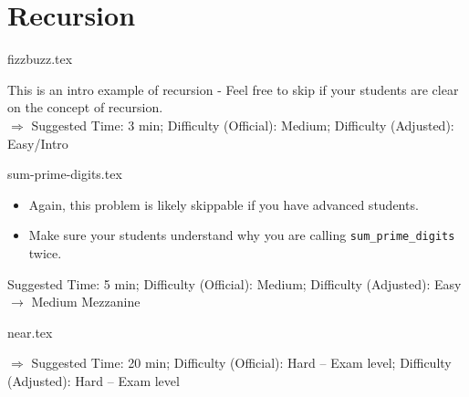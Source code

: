 \documentclass{exam}
\begin{document}
\section{Recursion}
\begin{questions}
    {fizzbuzz.tex}
    \begin{questionmeta}
        This is an intro example of recursion - Feel free to skip if your students are clear on the concept of recursion.\\
        $\Rightarrow$ Suggested Time: 3 min; Difficulty (Official): Medium; Difficulty (Adjusted): Easy/Intro
      \end{questionmeta}

    {sum-prime-digits.tex}
    \begin{questionmeta}
        \begin{itemize}
            \item Again, this problem is likely skippable if you have advanced students.
            \item Make sure your students understand why you are calling \lstinline{sum_prime_digits} twice.
        \end{itemize}    
        Suggested Time: 5 min; Difficulty (Official): Medium; Difficulty (Adjusted): Easy $\rightarrow$ Medium Mezzanine
      \end{questionmeta}
    
    {near.tex}
    \begin{questionmeta}
        $\Rightarrow$ Suggested Time: 20 min; Difficulty (Official): Hard -- Exam level; Difficulty (Adjusted): Hard -- Exam level
    \end{questionmeta}
\end{questions}
\end{document}
